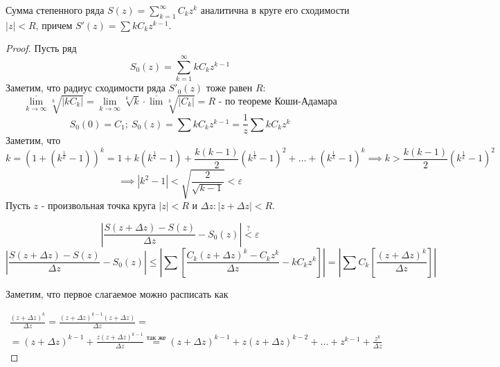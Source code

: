 \begin{theorem*}
    Сумма степенного ряда $S(z) = \sum_{k=1}^{\infty} C_k z^k$ аналитична в круге его сходимости $\left| z \right| < R$, 
    причем $S'(z) = \sum k C_k z^{k-1}$. 
    \begin{proof}
        Пусть ряд
        \begin{equation}
            \label{series}
            S_0(z) = \sum_{k = 1}^{\infty} kC_k z^{k-1}
        \end{equation}
        Заметим, что радиус сходимости ряда $S'_0(z)$ тоже равен $R$:
        \[\overline{\lim_{k \to \infty}} \sqrt[k]{\left| kC_k\right|} = \lim_{k \to \infty} \sqrt[k]{k} \cdot \overline{\lim} \sqrt[k]{\left| C_k\right|} = R \text{ - по теореме Коши-Адамара}\]
        \[S_0(0) = C_1; \ S_0(z) = \sum kC_k z^{k-1} = \frac{1}{z}\sum kC_k z^k\]
        Заметим, что
        \[k = (1+ (k^{\frac{1}{k}}-1))^k = 1 + k(k^{\frac{1}{k}} - 1) + \frac{k(k-1)}{2}(k^{\frac{1}{k}}-1)^2 + \hdots + (k^{\frac{1}{k}} - 1)^k \implies k > \frac{k(k-1)}{2}(k^{\frac{1}{k}}-1)^2\] \[\implies \left| k^2 - 1\right| < \sqrt{\frac{2}{\sqrt{k-1}}} < \varepsilon\]
        Пусть $z$ - произвольная точка круга $\left| z \right| < R$ и $\Delta z: \left| z + \Delta z \right| < R$.

        \[\left| \frac{S(z+\Delta z) - S(z)}{\Delta z} - S_0(z)\right| \overset{?}{<} \varepsilon\]
        \begin{equation}
            \label{module}
            \left| \frac{S(z + \Delta z) - S(z)}{\Delta z} -S_0(z) \right| \leq \left| \sum \left[ \frac{C_k(z + \Delta z)^k - C_k z^k}{\Delta z} - kC_k z^k \right] \right| = \left| \sum C_k \left[ \frac{(z + \Delta z)^k}{\Delta z}  \right] \right|
        \end{equation}

        Заметим, что первое слагаемое можно расписать как 
        
        \begin{multline}
            \label{binom}
            \frac{(z+\Delta z)^k}{\Delta z} = \frac{(z+\Delta z)^{k-1}(z+\Delta z)}{\Delta z} = \\ = (z+\Delta z)^{k-1} + \frac{z(z+\Delta z)^{k-1}}{\Delta z} \overset{\text{так же}}{=} (z+\Delta z)^{k-1} + z(z+\Delta z)^{k-2} + \hdots + z^{k-1} + \frac{z^k}{\Delta z}
        \end{multline}
    


\end{proof}
\end{theorem*}
